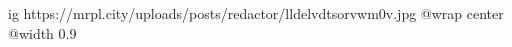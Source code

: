  
 
 
 
 

\ifcmt
  ig https://mrpl.city/uploads/posts/redactor/lldelvdtsorvwm0v.jpg
  @wrap center
  @width 0.9
\fi
